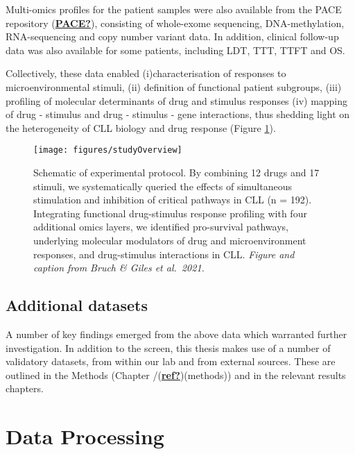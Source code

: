 \documentclass[11pt, a4paper, twosided]{book}
\begin{document}
Multi-omics profiles for the patient samples were also available from the PACE repository (\protect\hyperlink{ref-PACE}{\textbf{PACE?}}), consisting of whole-exome sequencing, DNA-methylation, RNA-sequencing and copy number variant data. In addition, clinical follow-up data was also available for some patients, including LDT, TTT, TTFT and OS.

Collectively, these data enabled (i)characterisation of responses to microenvironmental stimuli, (ii) definition of functional patient subgroups, (iii) profiling of molecular determinants of drug and stimulus responses (iv) mapping of drug - stimulus and drug - stimulus - gene interactions, thus shedding light on the heterogeneity of CLL biology and drug response (Figure \ref{fig:studyOverview}).


\begin{figure}

{\centering \texttt{[image: figures/studyOverview]} 

}

\caption{Schematic of experimental protocol. By combining 12 drugs and 17 stimuli, we systematically queried the effects of simultaneous stimulation and inhibition of critical pathways in CLL (n = 192). Integrating functional drug-stimulus response profiling with four additional omics layers, we identified pro-survival pathways, underlying molecular modulators of drug and microenvironment responses, and drug-stimulus interactions in CLL. \emph{Figure and caption from Bruch \& Giles et al.~2021.}}\label{fig:studyOverview}
\end{figure}
\hypertarget{additional-datasets}{%
\subsection{Additional datasets}\label{additional-datasets}}

A number of key findings emerged from the above data which warranted further investigation. In addition to the screen, this thesis makes use of a number of validatory datasets, from within our lab and from external sources. These are outlined in the Methods (Chapter /(\protect\hyperlink{ref-ref}{\textbf{ref?}})(methods)) and in the relevant results chapters.

\hypertarget{data-processing-1}{%
\section{Data Processing}\label{data-processing-1}}
\end{document}
